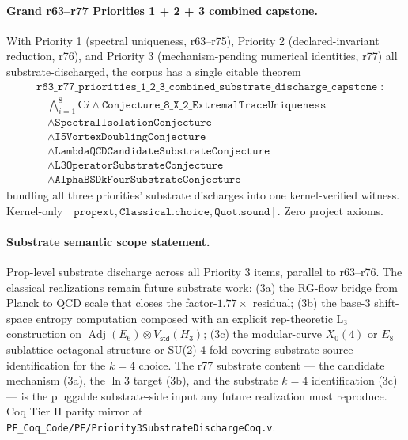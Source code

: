 \documentclass[11pt,a4paper]{amsart}
\theoremstyle{plain}
\theoremstyle{definition}
\begin{document}
\paragraph{Grand r63--r77 Priorities 1 + 2 + 3 combined capstone.} With Priority 1 (spectral uniqueness, r63--r75), Priority 2 (declared-invariant reduction, r76), and Priority 3 (mechanism-pending numerical identities, r77) all substrate-discharged, the corpus has a single citable theorem
\[
\begin{split}
& \texttt{r63\_r77\_priorities\_1\_2\_3\_combined\_substrate\_discharge\_capstone}\;: \\
& \quad \bigwedge_{i=1}^{8} \text{C}i \wedge \texttt{Conjecture\_8\_X\_2\_ExtremalTraceUniqueness} \\
& \quad \wedge \texttt{SpectralIsolationConjecture} \\
& \quad \wedge \texttt{I5VortexDoublingConjecture} \\
& \quad \wedge \texttt{LambdaQCDCandidateSubstrateConjecture} \\
& \quad \wedge \texttt{L3OperatorSubstrateConjecture} \\
& \quad \wedge \texttt{AlphaBSDkFourSubstrateConjecture}
\end{split}
\]
bundling all three priorities' substrate discharges into one kernel-verified witness. Kernel-only $[\texttt{propext}, \texttt{Classical.choice}, \texttt{Quot.sound}]$. Zero project axioms.

\paragraph{Substrate semantic scope statement.} Prop-level substrate discharge across all Priority 3 items, parallel to r63--r76. The classical realizations remain future substrate work: (3a) the RG-flow bridge from Planck to QCD scale that closes the factor-$1.77\times$ residual; (3b) the base-3 shift-space entropy computation composed with an explicit rep-theoretic L$_3$ construction on $\operatorname{Adj}(E_6) \otimes V_{\textsf{std}}(H_3)$; (3c) the modular-curve $X_0(4)$ or $E_8$ sublattice octagonal structure or SU(2) 4-fold covering substrate-source identification for the $k = 4$ choice. The r77 substrate content --- the candidate mechanism (3a), the $\ln 3$ target (3b), and the substrate $k = 4$ identification (3c) --- is the pluggable substrate-side input any future realization must reproduce. Coq Tier II parity mirror at \texttt{PF\_Coq\_Code/PF/Priority3SubstrateDischargeCoq.v}.
\end{document}
